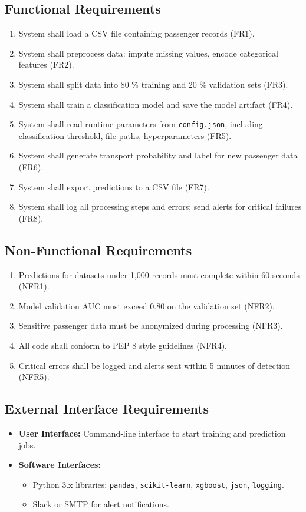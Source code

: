 \documentclass[15pt]{article}
\begin{document}
\subsection{Functional Requirements}
\begin{enumerate}[label=FR\arabic*:]
  \item System shall load a CSV file containing passenger records (FR1).
  \item System shall preprocess data: impute missing values, encode categorical features (FR2).
  \item System shall split data into 80 \% training and 20 \% validation sets (FR3).
  \item System shall train a classification model and save the model artifact (FR4).
  \item System shall read runtime parameters from \texttt{config.json}, including classification threshold, file paths, hyperparameters (FR5).
  \item System shall generate transport probability and label for new passenger data (FR6).
  \item System shall export predictions to a CSV file (FR7).
  \item System shall log all processing steps and errors; send alerts for critical failures (FR8).
\end{enumerate}

\subsection{Non-Functional Requirements}
\begin{enumerate}[label=NFR\arabic*:]
  \item Predictions for datasets under 1,000 records must complete within 60 seconds (NFR1).
  \item Model validation AUC must exceed 0.80 on the validation set (NFR2).
  \item Sensitive passenger data must be anonymized during processing (NFR3).
  \item All code shall conform to PEP 8 style guidelines (NFR4).
  \item Critical errors shall be logged and alerts sent within 5 minutes of detection (NFR5).
\end{enumerate}

\subsection{External Interface Requirements}
\begin{itemize}
  \item \textbf{User Interface:} Command‐line interface to start training and prediction jobs.
  \item \textbf{Software Interfaces:}  
    \begin{itemize}
      \item Python 3.x libraries: \texttt{pandas}, \texttt{scikit-learn}, \texttt{xgboost}, \texttt{json}, \texttt{logging}.
      \item Slack or SMTP for alert notifications.
    \end{itemize}
\end{itemize}
\end{document}
